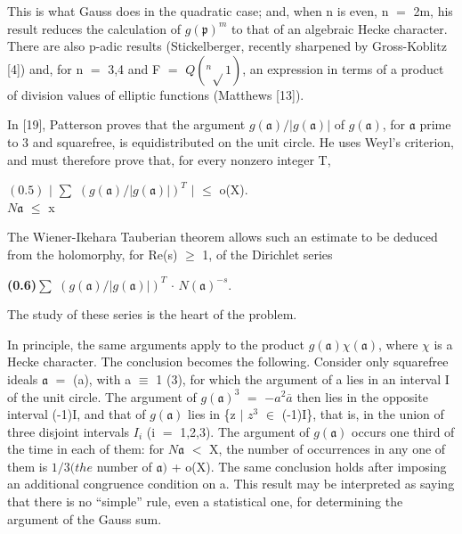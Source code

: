\documentclass[10pt,a4paper]{article}
\begin{document}
\clearpage
{}
\label{d035-physical-003}
\par This is what Gauss does in the quadratic case; and, when n is even, n $=$ 2m, his result reduces the calculation of $g(\mathfrak{p})^m$ to that of an algebraic Hecke character. There are also p-adic results (Stickelberger, recently sharpened by Gross-Koblitz [4]) and, for n $=$ 3,4 and F $=$ $Q(^{n}\sqrt{}1)$, an expression in terms of a product of division values of elliptic functions (Matthews [13]).\par
\par In [19], Patterson proves that the argument $g(\mathfrak{a})/|g(\mathfrak{a})|$ of $g(\mathfrak{a})$, for $\mathfrak{a}$ prime to 3 and squarefree, is equidistributed on the unit circle. He uses Weyl's criterion, and must therefore prove that, for every nonzero integer T,\par
\par\smallskip\begin{center}\begin{minipage}{0.96\textwidth}\centering
$(0.5)$ $|$ $\sum{}$ $(g(\mathfrak{a})/|g(\mathfrak{a})|)^T$ $|$ $\le{}$ o(X). \\ $N\mathfrak{a}$ $\le{}$ x
\end{minipage}\end{center}\smallskip
\par The Wiener-Ikehara Tauberian theorem allows such an estimate to be deduced from the holomorphy, for Re(s) $\ge{}$ 1, of the Dirichlet series\par
\par\noindent\textbf{(0.6)}\quad $\sum{}$ $(g(\mathfrak{a})/|g(\mathfrak{a})|)^T$ $\cdot{}$ $N(\mathfrak{a})^{-s}$.\par
\par The study of these series is the heart of the problem.\par
\par In principle, the same arguments apply to the product $g(\mathfrak{a})\chi{}(\mathfrak{a})$, where $\chi{}$ is a Hecke character. The conclusion becomes the following. Consider only squarefree ideals $\mathfrak{a}$ $=$ (a), with a $\equiv{}$ 1 (3), for which the argument of a lies in an interval I of the unit circle. The argument of $g(\mathfrak{a})^3$ $=$ $-a^2\overline{a}$ then lies in the opposite interval (-1)I, and that of $g(\mathfrak{a})$ lies in \{z $|$ $z^3$ $\in{}$ (-1)I\}, that is, in the union of three disjoint intervals $I_i$ (i $=$ 1,2,3). The argument of $g(\mathfrak{a})$ occurs one third of the time in each of them: for $N\mathfrak{a}$ $<$ X, the number of occurrences in any one of them is $1/3(the$ number of $\mathfrak{a})$ + o(X). The same conclusion holds after imposing an additional congruence condition on a. This result may be interpreted as saying that there is no ``simple'' rule, even a statistical one, for determining the argument of the Gauss sum.\par
\end{document}
